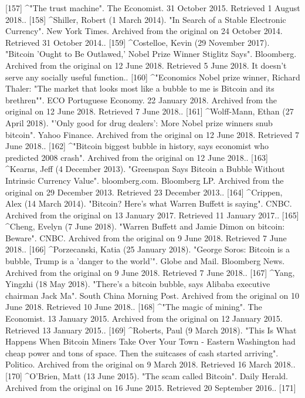 [157]
^"The trust machine". The Economist. 31 October 2015. Retrieved 1 August 2018..
[158]
^Shiller, Robert (1 March 2014). "In Search of a Stable Electronic Currency". New York Times. Archived from the original on 24 October 2014. Retrieved 31 October 2014..
[159]
^Costelloe, Kevin (29 November 2017). "Bitcoin 'Ought to Be Outlawed,' Nobel Prize Winner Stiglitz Says". Bloomberg. Archived from the original on 12 June 2018. Retrieved 5 June 2018. It doesn't serve any socially useful function..
[160]
^"Economics Nobel prize winner, Richard Thaler: "The market that looks most like a bubble to me is Bitcoin and its brethren"". ECO Portuguese Economy. 22 January 2018. Archived from the original on 12 June 2018. Retrieved 7 June 2018..
[161]
^Wolff-Mann, Ethan (27 April 2018). "'Only good for drug dealers': More Nobel prize winners snub bitcoin". Yahoo Finance. Archived from the original on 12 June 2018. Retrieved 7 June 2018..
[162]
^"Bitcoin biggest bubble in history, says economist who predicted 2008 crash". Archived from the original on 12 June 2018..
[163]
^Kearns, Jeff (4 December 2013). "Greenspan Says Bitcoin a Bubble Without Intrinsic Currency Value". bloomberg.com. Bloomberg LP. Archived from the original on 29 December 2013. Retrieved 23 December 2013..
[164]
^Crippen, Alex (14 March 2014). "Bitcoin? Here's what Warren Buffett is saying". CNBC. Archived from the original on 13 January 2017. Retrieved 11 January 2017..
[165]
^Cheng, Evelyn (7 June 2018). "Warren Buffett and Jamie Dimon on bitcoin: Beware". CNBC. Archived from the original on 9 June 2018. Retrieved 7 June 2018..
[166]
^Porzecanski, Katia (25 January 2018). "George Soros: Bitcoin is a bubble, Trump is a 'danger to the world'". Globe and Mail. Bloomberg News. Archived from the original on 9 June 2018. Retrieved 7 June 2018..
[167]
^Yang, Yingzhi (18 May 2018). "There's a bitcoin bubble, says Alibaba executive chairman Jack Ma". South China Morning Post. Archived from the original on 10 June 2018. Retrieved 10 June 2018..
[168]
^"The magic of mining". The Economist. 13 January 2015. Archived from the original on 12 January 2015. Retrieved 13 January 2015..
[169]
^Roberts, Paul (9 March 2018). "This Is What Happens When Bitcoin Miners Take Over Your Town - Eastern Washington had cheap power and tons of space. Then the suitcases of cash started arriving". Politico. Archived from the original on 9 March 2018. Retrieved 16 March 2018..
[170]
^O'Brien, Matt (13 June 2015). "The scam called Bitcoin". Daily Herald. Archived from the original on 16 June 2015. Retrieved 20 September 2016..
[171]

